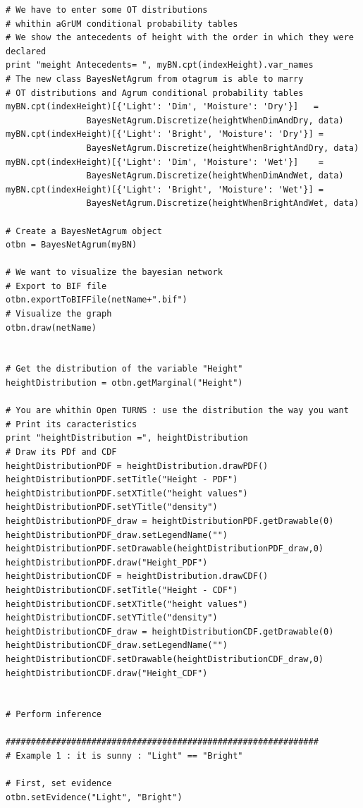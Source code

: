 \begin{lstlisting}
# We have to enter some OT distributions 
# whithin aGrUM conditional probability tables
# We show the antecedents of height with the order in which they were declared
print "meight Antecedents= ", myBN.cpt(indexHeight).var_names
# The new class BayesNetAgrum from otagrum is able to marry 
# OT distributions and Agrum conditional probability tables
myBN.cpt(indexHeight)[{'Light': 'Dim', 'Moisture': 'Dry'}]   = 
                BayesNetAgrum.Discretize(heightWhenDimAndDry, data)
myBN.cpt(indexHeight)[{'Light': 'Bright', 'Moisture': 'Dry'}] =
                BayesNetAgrum.Discretize(heightWhenBrightAndDry, data)
myBN.cpt(indexHeight)[{'Light': 'Dim', 'Moisture': 'Wet'}]    = 
                BayesNetAgrum.Discretize(heightWhenDimAndWet, data)
myBN.cpt(indexHeight)[{'Light': 'Bright', 'Moisture': 'Wet'}] = 
                BayesNetAgrum.Discretize(heightWhenBrightAndWet, data)

# Create a BayesNetAgrum object
otbn = BayesNetAgrum(myBN)

# We want to visualize the bayesian network 
# Export to BIF file
otbn.exportToBIFFile(netName+".bif")
# Visualize the graph
otbn.draw(netName)


# Get the distribution of the variable "Height"
heightDistribution = otbn.getMarginal("Height")

# You are whithin Open TURNS : use the distribution the way you want
# Print its caracteristics
print "heightDistribution =", heightDistribution
# Draw its PDf and CDF
heightDistributionPDF = heightDistribution.drawPDF()
heightDistributionPDF.setTitle("Height - PDF")
heightDistributionPDF.setXTitle("height values")
heightDistributionPDF.setYTitle("density")
heightDistributionPDF_draw = heightDistributionPDF.getDrawable(0)
heightDistributionPDF_draw.setLegendName("")
heightDistributionPDF.setDrawable(heightDistributionPDF_draw,0)
heightDistributionPDF.draw("Height_PDF")
heightDistributionCDF = heightDistribution.drawCDF()
heightDistributionCDF.setTitle("Height - CDF")
heightDistributionCDF.setXTitle("height values")
heightDistributionCDF.setYTitle("density")
heightDistributionCDF_draw = heightDistributionCDF.getDrawable(0)
heightDistributionCDF_draw.setLegendName("")
heightDistributionCDF.setDrawable(heightDistributionCDF_draw,0)
heightDistributionCDF.draw("Height_CDF")


# Perform inference

##############################################################
# Example 1 : it is sunny : "Light" == "Bright"

# First, set evidence
otbn.setEvidence("Light", "Bright")


\end{lstlisting}
